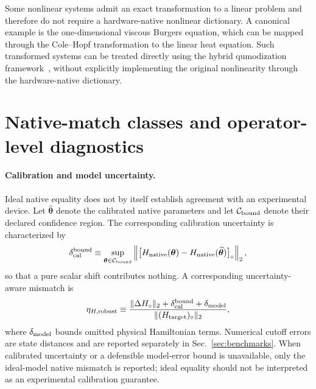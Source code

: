 \documentclass[pra,twocolumn,superscriptaddress,nofootinbib,floatfix]{revtex4-2}
\theoremstyle{remark}
\begin{document}
Some nonlinear systems admit an exact transformation to a linear problem and therefore do not require a hardware-native nonlinear dictionary. A canonical example is the one-dimensional viscous Burgers equation, which can be mapped through the Cole--Hopf transformation to the linear heat equation. Such transformed systems can be treated directly using the hybrid qumodization framework~\cite{das2026quantumdifferentialequationsolver}, without explicitly implementing the original nonlinearity through the hardware-native dictionary.

\section{Native-match classes and operator-level diagnostics}
\label{app:native-match}
\label{app:class-diagnostics}

\paragraph{Calibration and model uncertainty.}
Ideal native equality does not by itself establish agreement with an experimental device. Let \(\widehat{\boldsymbol\theta}\) denote the calibrated native parameters and let \(\mathcal C_{\rm bound}\) denote their declared confidence region. The corresponding calibration uncertainty is characterized by
\begin{align}
\delta_{\rm cal}^{\rm bound}\equiv\sup_{\boldsymbol\theta\in\mathcal C_{\rm bound}}\left\|\bigl[H_{\rm native}(\boldsymbol\theta)-H_{\rm native}(\widehat{\boldsymbol\theta})\bigr]_\circ\right\|_2 ,
\end{align}
so that a pure scalar shift contributes nothing. A corresponding uncertainty-aware mismatch is
\begin{align}
\eta_{H,{\rm robust}}\equiv\frac{\|\Delta H_\circ\|_2+\delta_{\rm cal}^{\rm bound}+\delta_{\rm model}}{\|(H_{\rm target})_\circ\|_2},
\label{eq:robust-native-mismatch}
\end{align}
where \(\delta_{\rm model}\) bounds omitted physical Hamiltonian terms. Numerical cutoff errors are state distances and are reported separately in Sec.~\ref{sec:benchmarks}.
When calibrated uncertainty or a defensible model-error bound is unavailable, only the ideal-model native mismatch is reported; ideal equality should not be interpreted as an experimental calibration guarantee.
\end{document}
